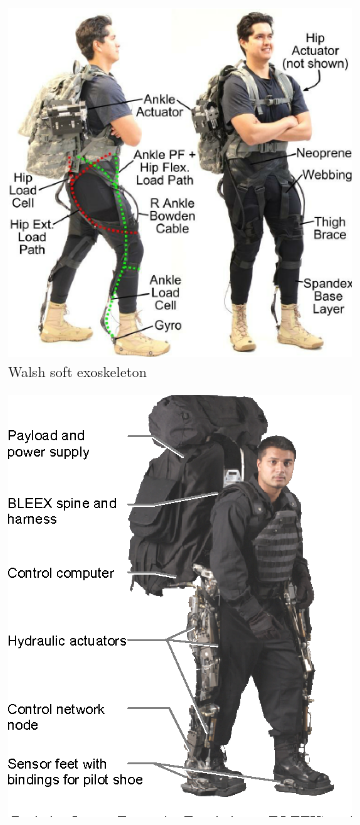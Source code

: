 \begin{figure}
     \centering
     \begin{subfigure}{0.5\textwidth}
    \centering
    \includegraphics[width=.9\linewidth]{images/background/walsh.png}
    \caption[Walsh soft exoskeleton]{Walsh soft exoskeleton \cite{panizzolo2015evaluation}}
    \label{fig:walsh}
     \end{subfigure}
     \hfill
     \begin{subfigure}{0.3\textwidth}
        \centering
    \includegraphics[width=.9\linewidth]{images/background/BLEEX2.png}

\end{subfigure}
\end{figure}
